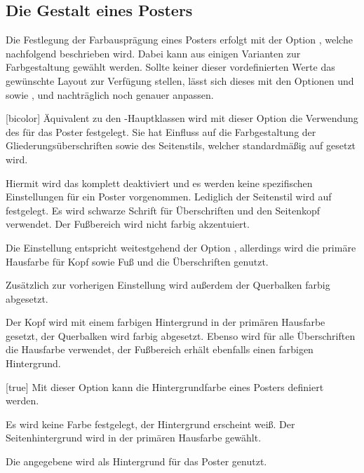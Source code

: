 \begin{Bundle*}[v2.05]{}
\subsection{Die Gestalt eines Posters}

Die Festlegung der Farbausprägung eines Posters erfolgt mit der Option 
, welche nachfolgend beschrieben wird. Dabei kann aus einigen 
Varianten zur Farbgestaltung gewählt werden. Sollte keiner dieser 
vordefinierten Werte das gewünschte Layout zur Verfügung stellen, lässt sich 
dieses mit den Optionen  und  sowie 
,  und  nachträglich 
noch genauer anpassen.


\begin{Declaration}{}[bicolor]
\printdeclarationlist%
%
Äquivalent zu den \TUDScript-Hauptklassen wird mit dieser Option die Verwendung 
des \TUDCDs für das Poster festgelegt. Sie hat Einfluss auf die Farbgestaltung 
der Gliederungsüberschriften sowie des Seitenstils, welcher standardmäßig auf 
 gesetzt wird.
%
\begin{values}{}
\itemfalse
  Hiermit wird das \CD komplett deaktiviert und es werden keine spezifischen 
  Einstellungen für ein Poster vorgenommen. Lediglich der Seitenstil wird auf 
   festgelegt.
  Es wird schwarze Schrift für Überschriften und den Seitenkopf verwendet. Der 
  Fußbereich wird nicht farbig akzentuiert.
\item[lightcolor/pale]
  Die Einstellung entspricht weitestgehend der Option , 
  allerdings wird die primäre Hausfarbe  für Kopf sowie Fuß und 
  die Überschriften genutzt.
\item[barcolor]
  Zusätzlich zur vorherigen Einstellung wird außerdem der Querbalken farbig 
  abgesetzt.
\item[bicolor/color/fullcolor]
  Der Kopf wird mit einem farbigen Hintergrund in der primären Hausfarbe 
   gesetzt, der Querbalken wird farbig abgesetzt. Ebenso wird für 
  alle Überschriften die Hausfarbe verwendet, der Fußbereich erhält ebenfalls 
  einen farbigen Hintergrund.
\end{values}
\end{Declaration}

\begin{Declaration}{}[true]
\printdeclarationlist%
%
Mit dieser Option kann die Hintergrundfarbe eines Posters definiert werden.
%
\begin{values}{}
\itemfalse[nocolor]
  Es wird keine Farbe festgelegt, der Hintergrund erscheint weiß.
\itemtrue*[color]
  Der Seitenhintergrund wird in der primären Hausfarbe  gewählt.
\item[\PValueName{Farbe}]
  Die angegebene  wird als Hintergrund für das Poster genutzt.
\end{values}
\end{Declaration}


\end{Bundle*}
